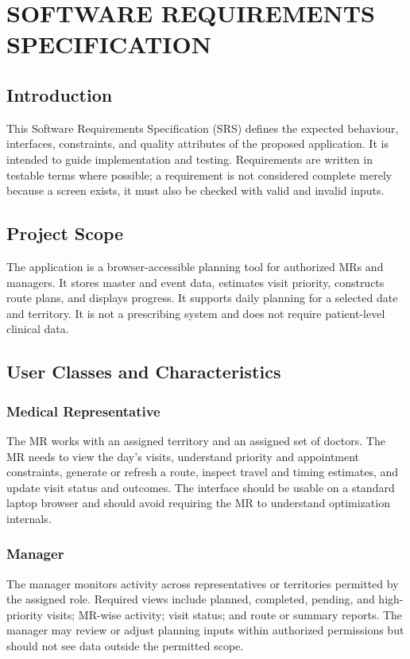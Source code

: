 \documentclass[12pt,a4paper,oneside]{report}
\begin{document}
\chapter{SOFTWARE REQUIREMENTS SPECIFICATION}

\section{Introduction}
This Software Requirements Specification (SRS) defines the expected behaviour, interfaces, constraints, and quality attributes of the proposed application. It is intended to guide implementation and testing. Requirements are written in testable terms where possible; a requirement is not considered complete merely because a screen exists, it must also be checked with valid and invalid inputs.

\section{Project Scope}
The application is a browser-accessible planning tool for authorized MRs and managers. It stores master and event data, estimates visit priority, constructs route plans, and displays progress. It supports daily planning for a selected date and territory. It is not a prescribing system and does not require patient-level clinical data.

\section{User Classes and Characteristics}
\subsection{Medical Representative}
The MR works with an assigned territory and an assigned set of doctors. The MR needs to view the day's visits, understand priority and appointment constraints, generate or refresh a route, inspect travel and timing estimates, and update visit status and outcomes. The interface should be usable on a standard laptop browser and should avoid requiring the MR to understand optimization internals.

\subsection{Manager}
The manager monitors activity across representatives or territories permitted by the assigned role. Required views include planned, completed, pending, and high-priority visits; MR-wise activity; visit status; and route or summary reports. The manager may review or adjust planning inputs within authorized permissions but should not see data outside the permitted scope.
\end{document}
